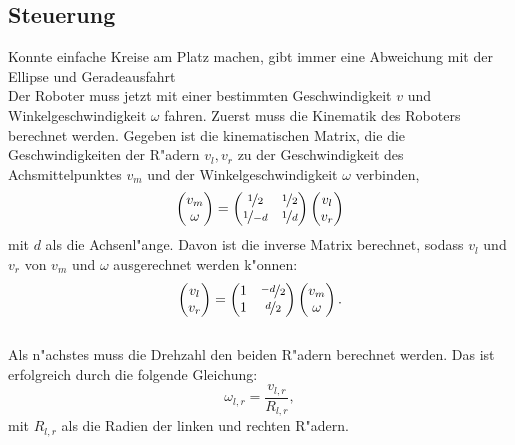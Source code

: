 \subsection{Steuerung}

Konnte einfache Kreise am Platz machen, gibt immer eine Abweichung mit der Ellipse und Geradeausfahrt\\

Der Roboter muss jetzt mit einer bestimmten Geschwindigkeit \(v\) und Winkelgeschwindigkeit \(\omega\) fahren. Zuerst muss die Kinematik des Roboters berechnet werden. Gegeben ist die kinematischen Matrix, die die Geschwindigkeiten der R"adern \(v_l, v_r\) zu der Geschwindigkeit des Achsmittelpunktes \(v_m\) und der Winkelgeschwindigkeit \(\omega\) verbinden,
\begin{equation}
    \begin{pmatrix}
        v_m \\
        \omega
    \end{pmatrix}
    =
    \begin{pmatrix}
        \nicefrac{1}{2} & \nicefrac{1}{2} \\
        \nicefrac{1}{-d} & \nicefrac{1}{d}
    \end{pmatrix}
    \begin{pmatrix}
        v_l \\
        v_r
    \end{pmatrix}
\end{equation}
mit \(d\) als die Achsenl"ange. 
Davon ist die inverse Matrix berechnet, sodass \(v_l\) und \(v_r\) von \(v_m\) und \(\omega\) ausgerechnet werden k"onnen:
\begin{equation}
    \begin{pmatrix}
        v_l \\
        v_r
    \end{pmatrix}
    = 
    \begin{pmatrix}
        1 & \nicefrac{-d}{2} \\
        1 & \nicefrac{d}{2}
    \end{pmatrix}
    \begin{pmatrix}
        v_m \\
        \omega
    \end{pmatrix}
    .
\end{equation} \\

Als n"achstes muss die Drehzahl den beiden R"adern berechnet werden. Das ist erfolgreich durch die folgende Gleichung:
\begin{equation}
    \omega_{l,r} = \dfrac{v_{l,r}}{R_{l,r}},
\end{equation}
mit \(R_{l,r}\) als die Radien der linken und rechten R"adern. \\

